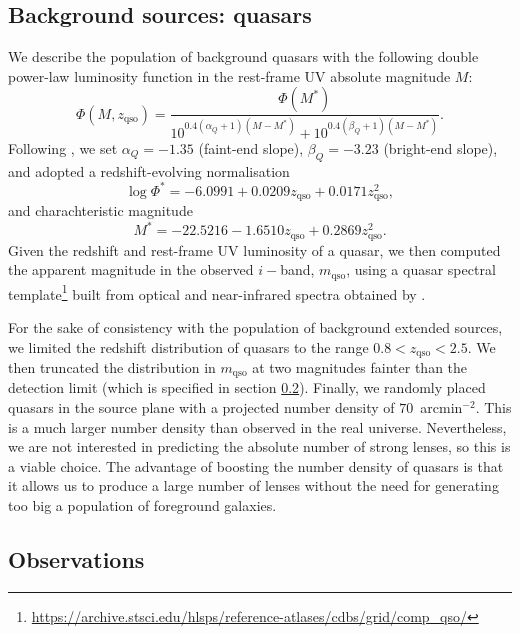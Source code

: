 \documentclass{aa}
\def\zqso{z_{\mathrm{qso}}}
\def\mqso{m_{\mathrm{qso}}}
\begin{document}
\subsection{Background sources: quasars}\label{ssec:quasars}

We describe the population of background quasars with the following double power-law luminosity function in the rest-frame UV absolute magnitude $M$:
\begin{equation}
\Phi(M,\zqso) = \dfrac{\Phi(M^*)}{10^{0.4(\alpha_Q+1)(M - M^*)} + 10^{0.4(\beta_Q+1)(M - M^*)}}.
\end{equation}
Following \citet{Man++17}, we set $\alpha_Q=-1.35$ (faint-end slope), $\beta_Q=-3.23$ (bright-end slope), and adopted a redshift-evolving normalisation
\begin{equation}
\log{\Phi^*} = -6.0991 + 0.0209\zqso + 0.0171\zqso^2,
\end{equation}
and charachteristic magnitude
\begin{equation}
M^* = -22.5216 - 1.6510\zqso + 0.2869\zqso^2.
\end{equation}
Given the redshift and rest-frame UV luminosity of a quasar, we then computed the apparent magnitude in the observed $i-$band, $\mqso$, using a quasar spectral template\footnote{\url{https://archive.stsci.edu/hlsps/reference-atlases/cdbs/grid/comp_qso/}} built from optical and near-infrared spectra obtained by \citet{vdB++01,Gli++06}.

For the sake of consistency with the population of background extended sources, we limited the redshift distribution of quasars to the range $0.8 < \zqso < 2.5$.
We then truncated the distribution in $\mqso$ at two magnitudes fainter than the detection limit (which is specified in section \ref{ssub:obs}).
Finally, we randomly placed quasars in the source plane with a projected number density of $70$~arcmin$^{-2}$. This is a much larger number density than observed in the real universe. Nevertheless, we are not interested in predicting the absolute number of strong lenses, so this is a viable choice. The advantage of boosting the number density of quasars is that it allows us to produce a large number of lenses without the need for generating too big a population of foreground galaxies.


\subsection{Observations}\label{ssub:obs}
\end{document}
